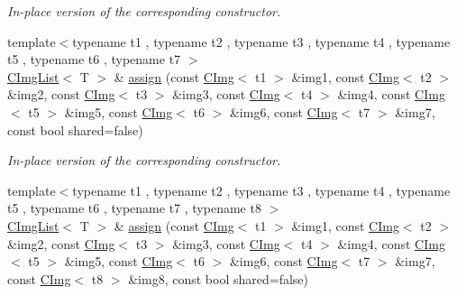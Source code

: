 \begin{DoxyCompactItemize}
\begin{DoxyCompactList}\small\item\em In-\/place version of the corresponding constructor. \item\end{DoxyCompactList}\item 
\hypertarget{structcimg__library_1_1CImgList_ad221dc2a95d6921ad185721030882d62}{
{\footnotesize template$<$typename t1 , typename t2 , typename t3 , typename t4 , typename t5 , typename t6 , typename t7 $>$ }\\\hyperlink{structcimg__library_1_1CImgList}{CImgList}$<$ T $>$ \& \hyperlink{structcimg__library_1_1CImgList_ad221dc2a95d6921ad185721030882d62}{assign} (const \hyperlink{structcimg__library_1_1CImg}{CImg}$<$ t1 $>$ \&img1, const \hyperlink{structcimg__library_1_1CImg}{CImg}$<$ t2 $>$ \&img2, const \hyperlink{structcimg__library_1_1CImg}{CImg}$<$ t3 $>$ \&img3, const \hyperlink{structcimg__library_1_1CImg}{CImg}$<$ t4 $>$ \&img4, const \hyperlink{structcimg__library_1_1CImg}{CImg}$<$ t5 $>$ \&img5, const \hyperlink{structcimg__library_1_1CImg}{CImg}$<$ t6 $>$ \&img6, const \hyperlink{structcimg__library_1_1CImg}{CImg}$<$ t7 $>$ \&img7, const bool shared=false)}
\label{structcimg__library_1_1CImgList_ad221dc2a95d6921ad185721030882d62}

\begin{DoxyCompactList}\small\item\em In-\/place version of the corresponding constructor. \item\end{DoxyCompactList}\item 
\hypertarget{structcimg__library_1_1CImgList_ac73f5df1ac298719adf44a9ea527e0a3}{
{\footnotesize template$<$typename t1 , typename t2 , typename t3 , typename t4 , typename t5 , typename t6 , typename t7 , typename t8 $>$ }\\\hyperlink{structcimg__library_1_1CImgList}{CImgList}$<$ T $>$ \& \hyperlink{structcimg__library_1_1CImgList_ac73f5df1ac298719adf44a9ea527e0a3}{assign} (const \hyperlink{structcimg__library_1_1CImg}{CImg}$<$ t1 $>$ \&img1, const \hyperlink{structcimg__library_1_1CImg}{CImg}$<$ t2 $>$ \&img2, const \hyperlink{structcimg__library_1_1CImg}{CImg}$<$ t3 $>$ \&img3, const \hyperlink{structcimg__library_1_1CImg}{CImg}$<$ t4 $>$ \&img4, const \hyperlink{structcimg__library_1_1CImg}{CImg}$<$ t5 $>$ \&img5, const \hyperlink{structcimg__library_1_1CImg}{CImg}$<$ t6 $>$ \&img6, const \hyperlink{structcimg__library_1_1CImg}{CImg}$<$ t7 $>$ \&img7, const \hyperlink{structcimg__library_1_1CImg}{CImg}$<$ t8 $>$ \&img8, const bool shared=false)}
\label{structcimg__library_1_1CImgList_ac73f5df1ac298719adf44a9ea527e0a3}


\end{DoxyCompactItemize}

